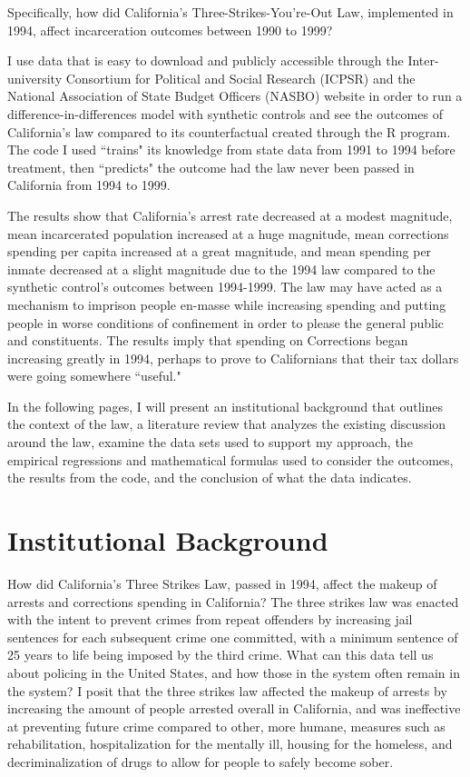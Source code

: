 \documentclass[12pt]{article}
\begin{document}
    Specifically, how did California's Three-Strikes-You're-Out Law, implemented in 1994, affect incarceration outcomes between 1990 to 1999?

    I use data that is easy to download and publicly accessible through the Inter-university Consortium for Political and Social Research (ICPSR) and the National Association of State Budget Officers (NASBO) website in order to run a difference-in-differences model with synthetic controls and see the outcomes of California's law compared to its counterfactual created through the R program. The code I used ``trains" its knowledge from state data from 1991 to 1994 before treatment, then ``predicts" the outcome had the law never been passed in California from 1994 to 1999.
    
    The results show that California's arrest rate decreased at a modest magnitude, mean incarcerated population increased at a huge magnitude, mean corrections spending per capita increased at a great magnitude, and mean spending per inmate decreased at a slight magnitude due to the 1994 law compared to the synthetic control's outcomes between 1994-1999. The law may have acted as a mechanism to imprison people en-masse while increasing spending and putting people in worse conditions of confinement in order to please the general public and constituents. The results imply that spending on Corrections began increasing greatly in 1994, perhaps to prove to Californians that their tax dollars were going somewhere ``useful." 

    In the following pages, I will present an institutional background that outlines the context of the law, a literature review that analyzes the existing discussion around the law, examine the data sets used to support my approach, the empirical regressions and mathematical formulas used to consider the outcomes, the results from the code, and the conclusion of what the data indicates. 
    
\section{Institutional Background}

  How did California’s Three Strikes Law, passed in 1994, affect the makeup of arrests and corrections spending in California? The three strikes law was enacted with the intent to prevent crimes from repeat offenders by increasing jail sentences for each subsequent crime one committed, with a minimum sentence of 25 years to life being imposed by the third crime. What can this data tell us about policing in the United States, and how those in the system often remain in the system? I posit that the three strikes law affected the makeup of arrests by increasing the amount of people arrested overall in California, and was ineffective at preventing future crime compared to other, more humane, measures such as rehabilitation, hospitalization for the mentally ill, housing for the homeless, and decriminalization of drugs to allow for people to safely become sober.
\end{document}
